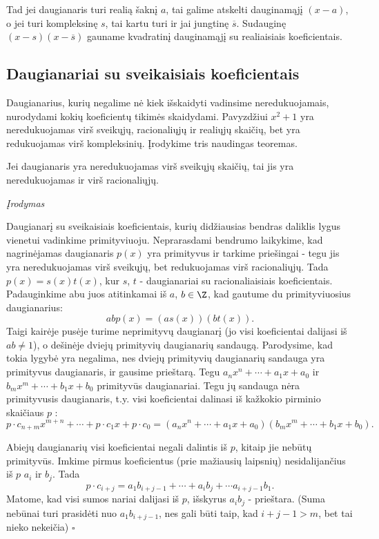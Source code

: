 Tad jei daugianaris turi realią šaknį $a$, tai galime atskelti dauginamąjį
$(x-a)$, o jei turi kompleksinę $s$, tai kartu turi ir jai jungtinę
$\overline{s}$. Sudauginę $(x-s)(x-\overline{s})$ gauname kvadratinį
dauginamąjį su realiaisiais koeficientais.

\subsection{Daugianariai su sveikaisiais koeficientais}

Daugianarius, kurių negalime nė kiek išskaidyti vadinsime neredukuojamais,
nurodydami kokių koeficientų tikimės skaidydami. Pavyzdžiui $x^2 + 1$ yra
neredukuojamas virš sveikųjų, racionaliųjų ir realiųjų skaičių, bet yra
redukuojamas virš kompleksinių. Įrodykime tris naudingas teoremas.

\begin{thm} Jei daugianaris yra neredukuojamas virš sveikųjų
  skaičių, tai jis yra neredukuojamas ir virš racionaliųjų.  \end{thm}

\emph{Įrodymas}

Daugianarį su sveikaisiais koeficientais, kurių didžiausias bendras
daliklis lygus vienetui vadinkime primityviuoju. Neprarasdami bendrumo
laikykime, kad nagrinėjamas daugianaris $p(x)$ yra primityvus ir tarkime
priešingai - tegu jis yra neredukuojamas virš sveikųjų, bet redukuojamas
virš racionaliųjų. Tada $p(x)=s(x)t(x)$, kur $s$, $t$ - daugianariai su
racionaliaisiais koeficientais. Padauginkime abu juos atitinkamai iš $a$,
$b \in \Z$, kad gautume du primityviuosius daugianarius: $$abp(x) =
(as(x))(bt(x)).$$ Taigi kairėje pusėje turime neprimityvų daugianarį (jo
visi koeficientai dalijasi iš $ab\neq 1$), o dešinėje dviejų primityvių
daugianarių sandaugą. Parodysime, kad tokia lygybė yra negalima, nes dviejų
primityvių daugianarių sandauga yra primityvus daugianaris, ir gausime
prieštarą.  Tegu $a_nx^n + \cdots + a_1x + a_0$ ir $b_mx^m + \cdots + b_1x
+ b_0$ primityvūs daugianariai. Tegu jų sandauga nėra primityvusis
daugianaris, t.y. visi koeficientai dalinasi iš kažkokio pirminio skaičiaus
$p$ : $$p\cdot c_{n+m}x^{m+n} + \cdots + p\cdot c_1x + p\cdot c_0 = (a_nx^n
+ \cdots + a_1x + a_0)(b_mx^m + \cdots + b_1x + b_0).$$

Abiejų daugianarių visi koeficientai negali dalintis iš $p$, kitaip jie
nebūtų primityvūs. Imkime pirmus koeficientus (prie mažiausių laipsnių)
nesidalijančius iš $p$ $a_i$ ir $b_j$. Tada $$p\cdot c_{i+j} =
a_{1}b_{i+j-1} + \cdots + a_{i}b_{j} + \cdots a_{i+j-1}b_{1}.$$ Matome, kad
visi sumos nariai dalijasi iš $p$, išskyrus $a_{i}b_{j}$ - prieštara. (Suma
nebūnai turi prasidėti nuo $a_{1}b_{i+j-1}$, nes gali būti taip, kad $i+j-1
> m$, bet tai nieko nekeičia) $\square$

